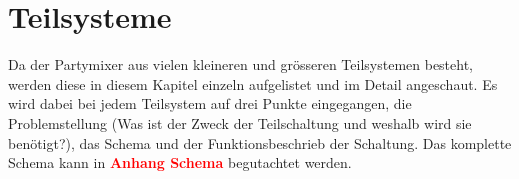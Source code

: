 \newpage
\section{Teilsysteme}
\label{sec:Teilsysteme}

Da der Partymixer aus vielen kleineren und grösseren Teilsystemen besteht, werden diese in diesem Kapitel einzeln aufgelistet und im Detail angeschaut.
Es wird dabei bei jedem Teilsystem auf drei Punkte eingegangen, die Problemstellung (Was ist der Zweck der Teilschaltung und weshalb wird sie benötigt?), das Schema und der Funktionsbeschrieb der Schaltung. Das komplette Schema kann in  \textcolor{red}{\textbf{Anhang Schema}} begutachtet werden.

